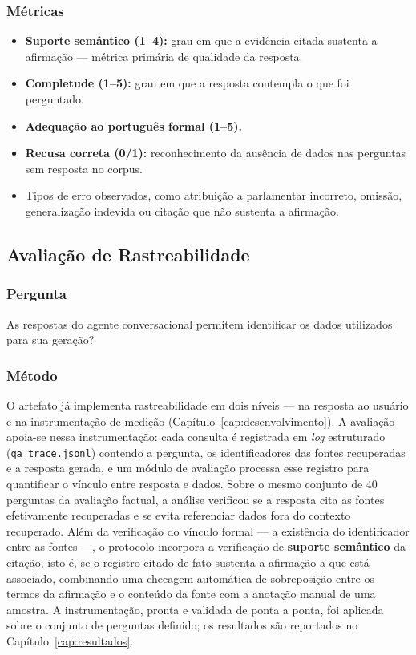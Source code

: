 \subsubsection{Métricas}
\begin{itemize}
    \item \textbf{Suporte semântico (1--4):} grau em que a evidência citada sustenta a afirmação --- métrica primária de qualidade da resposta.
    \item \textbf{Completude (1--5):} grau em que a resposta contempla o que foi perguntado.
    \item \textbf{Adequação ao português formal (1--5).}
    \item \textbf{Recusa correta (0/1):} reconhecimento da ausência de dados nas perguntas sem resposta no corpus.
    \item Tipos de erro observados, como atribuição a parlamentar incorreto, omissão, generalização indevida ou citação que não sustenta a afirmação.
\end{itemize}

\subsection{Avaliação de Rastreabilidade}

\subsubsection{Pergunta}
As respostas do agente conversacional permitem identificar os dados utilizados para sua geração?

\subsubsection{Método}
O artefato já implementa rastreabilidade em dois níveis --- na resposta ao usuário e na instrumentação de medição (Capítulo~\ref{cap:desenvolvimento}). A avaliação apoia-se nessa instrumentação: cada consulta é registrada em \textit{log} estruturado (\texttt{qa\_trace.jsonl}) contendo a pergunta, os identificadores das fontes recuperadas e a resposta gerada, e um módulo de avaliação processa esse registro para quantificar o vínculo entre resposta e dados. Sobre o mesmo conjunto de 40 perguntas da avaliação factual, a análise verificou se a resposta cita as fontes efetivamente recuperadas e se evita referenciar dados fora do contexto recuperado. Além da verificação do vínculo formal --- a existência do identificador entre as fontes ---, o protocolo incorpora a verificação de \textbf{suporte semântico} da citação, isto é, se o registro citado de fato sustenta a afirmação a que está associado, combinando uma checagem automática de sobreposição entre os termos da afirmação e o conteúdo da fonte com a anotação manual de uma amostra. A instrumentação, pronta e validada de ponta a ponta, foi aplicada sobre o conjunto de perguntas definido; os resultados são reportados no Capítulo~\ref{cap:resultados}.

